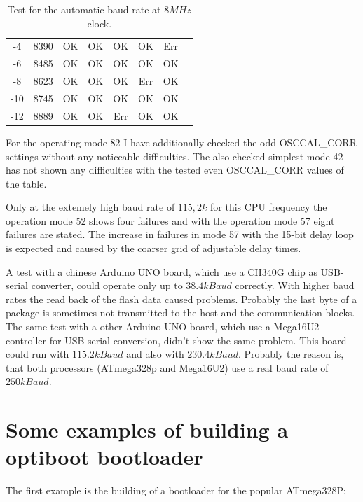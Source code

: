 \begin{table}[H]
\begin{center}
\begin{tabular}{| c | c || c | c | c || c |  c | c |}
    \hline
    -4     &  8390   &  OK       &   OK    &  OK     &  OK     &   Err \\
    -6     &  8485   &  OK       &   OK    &  OK     &  OK     &   OK  \\
    \hline
    -8     &  8623   &  OK       &   OK    &  OK     &  Err    &   OK  \\
    -10    &  8745   &  OK       &   OK    &  OK     &  OK     &   OK  \\
    -12    &  8889   &  OK       &   OK    &  Err    &  OK     &   OK  \\
    \hline
    \end{tabular}
  \end{center}
  \caption{Test for the automatic baud rate at \(8MHz\) clock.}
  \label{tab:AutoBaudTest8}
\end{table}

For the operating mode 82 I have additionally checked the odd OSCCAL\_CORR settings without
any noticeable difficulties. The also checked simplest mode 42 has not shown
any difficulties with the tested even OSCCAL\_CORR values of the table.

Only at the extemely high baud rate of \(115,2k\) for this CPU frequency the operation
mode 52 shows four failures and with the operation mode 57 eight failures are stated.
The increase in failures in mode 57 with the 15-bit delay loop is expected and caused by
the coarser grid of adjustable delay times.

A test with a chinese Arduino UNO board, which use a CH340G chip as USB-serial converter,
could operate only up to \(38.4kBaud\) correctly.
With higher baud rates the read back of the flash data caused problems.
Probably the last byte of a package is sometimes not transmitted to the host and
the communication blocks.
The same test with a other Arduino UNO board, which use a Mega16U2 controller
for USB-serial conversion, didn't show the same problem.
This board could run with \(115.2kBaud\) and also with \(230.4kBaud\). 
Probably the reason is, that both processors (ATmega328p and Mega16U2)
use a real baud rate of \(250kBaud\).


\section{Some examples of building a optiboot bootloader}

The first example is the building of a bootloader for the popular ATmega328P:

